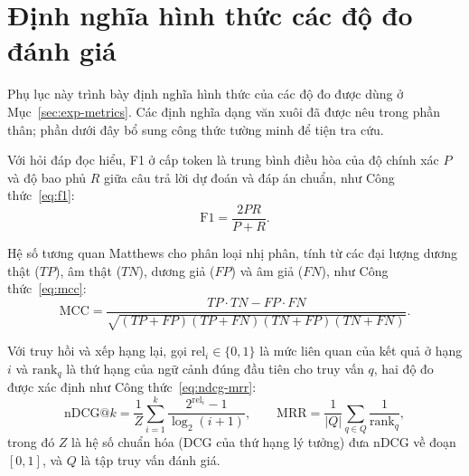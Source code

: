 \chapter{Định nghĩa hình thức các độ đo đánh giá}
\label{app:metrics}

Phụ lục này trình bày định nghĩa hình thức của các độ đo được dùng ở
Mục~\ref{sec:exp-metrics}. Các định nghĩa dạng văn xuôi đã được nêu trong phần thân;
phần dưới đây bổ sung công thức tường minh để tiện tra cứu.

Với hỏi đáp đọc hiểu, F1 ở cấp token là trung bình điều hòa của độ chính xác $P$ và độ
bao phủ $R$ giữa câu trả lời dự đoán và đáp án chuẩn, như Công thức~\eqref{eq:f1}:
\begin{equation}
  \label{eq:f1}
  \mathrm{F1} = \frac{2PR}{P + R}.
\end{equation}

Hệ số tương quan Matthews cho phân loại nhị phân, tính từ các đại lượng dương thật ($TP$),
âm thật ($TN$), dương giả ($FP$) và âm giả ($FN$), như Công thức~\eqref{eq:mcc}:
\begin{equation}
  \label{eq:mcc}
  \mathrm{MCC} = \frac{TP\cdot TN - FP\cdot FN}
  {\sqrt{(TP+FP)(TP+FN)(TN+FP)(TN+FN)}}.
\end{equation}

Với truy hồi và xếp hạng lại, gọi $\mathrm{rel}_i \in \{0,1\}$ là mức liên quan của kết quả ở
hạng $i$ và $\mathrm{rank}_q$ là thứ hạng của ngữ cảnh đúng đầu tiên cho truy vấn $q$, hai độ
đo được xác định như Công thức~\eqref{eq:ndcg-mrr}:
\begin{equation}
  \label{eq:ndcg-mrr}
  \mathrm{nDCG@}k = \frac{1}{Z}\sum_{i=1}^{k}\frac{2^{\mathrm{rel}_i}-1}{\log_2(i+1)},
  \qquad
  \mathrm{MRR} = \frac{1}{|Q|}\sum_{q\in Q}\frac{1}{\mathrm{rank}_q},
\end{equation}
trong đó $Z$ là hệ số chuẩn hóa (DCG của thứ hạng lý tưởng) đưa nDCG về đoạn $[0,1]$, và $Q$
là tập truy vấn đánh giá.
